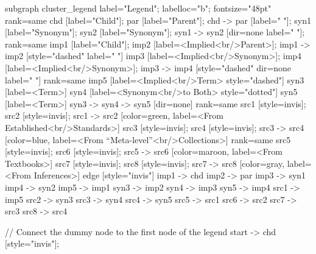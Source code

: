 \documentclass{article}
\begin{document}
{subgraph cluster_legend {
    label="Legend";
    labelloc="b";
    fontsize="48pt"
    {
        rank=same
        chd [label="Child"];
        par [label="Parent"];
        chd -> par [label="                "];
        syn1 [label="Synonym"];
        syn2 [label="Synonym"];
        syn1 -> syn2 [dir=none label="                "];
    }
    {
        rank=same
        imp1 [label="Child"];
        imp2 [label=<Implied<br/>Parent>];
        imp1 -> imp2 [style="dashed" label="                "]
        imp3 [label=<Implied<br/>Synonym>];
        imp4 [label=<Implied<br/>Synonym>];
        imp3 -> imp4 [style="dashed" dir=none label="                "]
    }
    {
        rank=same
        imp5 [label=<Implied<br/>Term> style="dashed"]
        syn3 [label=<Term>]
        syn4 [label=<Synonym<br/>to Both> style="dotted"]
        syn5 [label=<Term>]
        syn3 -> syn4 -> syn5 [dir=none]
    }
{
rank=same
src1 [style=invis];
src2 [style=invis];
src1 -> src2 [color=green, label=<From Established<br/>Standards>]
src3 [style=invis];
src4 [style=invis];
src3 -> src4 [color=blue, label=<From ``Meta-level''<br/>Collections>]
}
{
rank=same
src5 [style=invis];
src6 [style=invis];
src5 -> src6 [color=maroon, label=<From Textbooks>]
src7 [style=invis];
src8 [style=invis];
src7 -> src8 [color=gray, label=<From Inferences>]
}
    edge [style="invis"]
    imp1 -> chd
    imp2 -> par
    imp3 -> syn1
    imp4 -> syn2
imp5 -> imp1
syn3 -> imp2
syn4 -> imp3
syn5 -> imp4
src1 -> imp5
src2 -> syn3
src3 -> syn4
src4 -> syn5
src5 -> src1
src6 -> src2
src7 -> src3
src8 -> src4
}

// Connect the dummy node to the first node of the legend
start -> chd [style="invis"];
}
\end{document}
